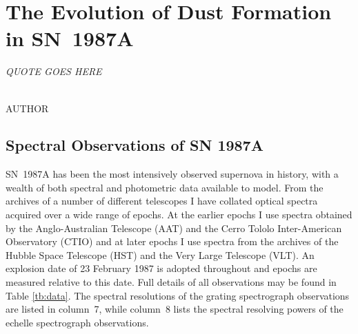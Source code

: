\chapter{The Evolution of Dust Formation in SN~1987A}\label{chp:chp5}

\begin{flushright}
  {\em QUOTE GOES HERE }\\

\ \

\normalsize
{AUTHOR}  
\end{flushright}

\section{Spectral Observations of SN 1987A}
\label{spectra}


SN~1987A has been the most intensively observed supernova in history, with 
a wealth of both spectral and photometric data available to model.  From 
the archives of a number of different telescopes I have collated optical 
spectra acquired over a wide range of epochs.  At the earlier epochs I 
use spectra obtained by the Anglo-Australian Telescope (AAT) and the Cerro 
Tololo Inter-American Observatory (CTIO) and at later epochs I 
use spectra from the archives of the Hubble Space Telescope (HST) and the Very 
Large Telescope (VLT).  An explosion date of 23 February 1987 is adopted 
throughout and epochs are measured relative to this date.  Full details of 
all observations may be found in Table \ref{tb:data}. The spectral 
resolutions of the grating spectrograph observations are listed in 
column~7, while column~8 lists the spectral resolving powers of the 
echelle spectrograph observations.


